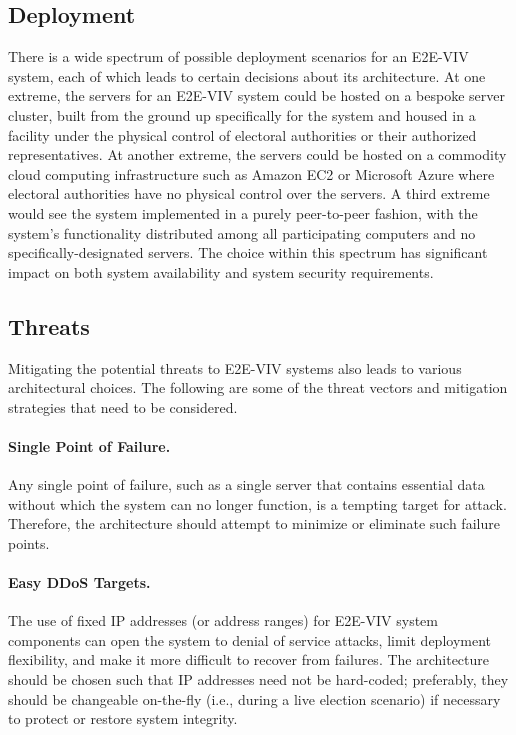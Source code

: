 \subsection{Deployment}

There is a wide spectrum of possible deployment scenarios for an
E2E-VIV system, each of which leads to certain decisions about its
architecture. At one extreme, the servers for an E2E-VIV system could
be hosted on a bespoke server cluster, built from the ground up
specifically for the system and housed in a facility under the
physical control of electoral authorities or their authorized
representatives. At another extreme, the servers could be hosted on a
commodity cloud computing infrastructure such as Amazon EC2 or
Microsoft Azure where electoral authorities have no physical control
over the servers. A third extreme would see the system implemented in
a purely peer-to-peer fashion, with the system's functionality
distributed among all participating computers and no
specifically-designated servers. The choice within this spectrum has
significant impact on both system availability and system security
requirements.

\subsection{Threats}
\label{sec:threats}

Mitigating the potential threats to E2E-VIV systems also leads to
various architectural choices. The following are some of the threat
vectors and mitigation strategies that need to be considered.

\paragraph {Single Point of Failure.} Any single point of failure,
such as a single server that contains essential data without which the
system can no longer function, is a tempting target for
attack. Therefore, the architecture should attempt to minimize or
eliminate such failure points.

\paragraph{Easy DDoS Targets.} The use of fixed IP addresses (or
address ranges) for E2E-VIV system components can open the system to
denial of service attacks, limit deployment flexibility, and make it
more difficult to recover from failures. The architecture should be
chosen such that IP addresses need not be hard-coded; preferably, they
should be changeable on-the-fly (i.e., during a live election
scenario) if necessary to protect or restore system integrity.

